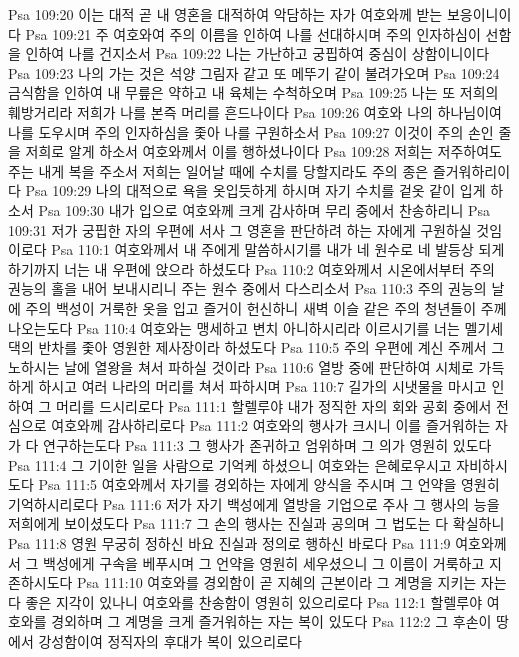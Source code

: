 Psa 109:20  이는 대적 곧 내 영혼을 대적하여 악담하는 자가 여호와께 받는 보응이니이다
Psa 109:21  주 여호와여 주의 이름을 인하여 나를 선대하시며 주의 인자하심이 선함을 인하여 나를 건지소서
Psa 109:22  나는 가난하고 궁핍하여 중심이 상함이니이다
Psa 109:23  나의 가는 것은 석양 그림자 같고 또 메뚜기 같이 불려가오며
Psa 109:24  금식함을 인하여 내 무릎은 약하고 내 육체는 수척하오며
Psa 109:25  나는 또 저희의 훼방거리라 저희가 나를 본즉 머리를 흔드나이다
Psa 109:26  여호와 나의 하나님이여 나를 도우시며 주의 인자하심을 좇아 나를 구원하소서
Psa 109:27  이것이 주의 손인 줄을 저희로 알게 하소서 여호와께서 이를 행하셨나이다
Psa 109:28  저희는 저주하여도 주는 내게 복을 주소서 저희는 일어날 때에 수치를 당할지라도 주의 종은 즐거워하리이다
Psa 109:29  나의 대적으로 욕을 옷입듯하게 하시며 자기 수치를 겉옷 같이 입게 하소서
Psa 109:30  내가 입으로 여호와께 크게 감사하며 무리 중에서 찬송하리니
Psa 109:31  저가 궁핍한 자의 우편에 서사 그 영혼을 판단하려 하는 자에게 구원하실 것임이로다
Psa 110:1  여호와께서 내 주에게 말씀하시기를 내가 네 원수로 네 발등상 되게 하기까지 너는 내 우편에 앉으라 하셨도다
Psa 110:2  여호와께서 시온에서부터 주의 권능의 홀을 내어 보내시리니 주는 원수 중에서 다스리소서
Psa 110:3  주의 권능의 날에 주의 백성이 거룩한 옷을 입고 즐거이 헌신하니 새벽 이슬 같은 주의 청년들이 주께 나오는도다
Psa 110:4  여호와는 맹세하고 변치 아니하시리라 이르시기를 너는 멜기세댁의 반차를 좇아 영원한 제사장이라 하셨도다
Psa 110:5  주의 우편에 계신 주께서 그 노하시는 날에 열왕을 쳐서 파하실 것이라
Psa 110:6  열방 중에 판단하여 시체로 가득하게 하시고 여러 나라의 머리를 쳐서 파하시며
Psa 110:7  길가의 시냇물을 마시고 인하여 그 머리를 드시리로다
Psa 111:1  할렐루야 내가 정직한 자의 회와 공회 중에서 전심으로 여호와께 감사하리로다
Psa 111:2  여호와의 행사가 크시니 이를 즐거워하는 자가 다 연구하는도다
Psa 111:3  그 행사가 존귀하고 엄위하며 그 의가 영원히 있도다
Psa 111:4  그 기이한 일을 사람으로 기억케 하셨으니 여호와는 은혜로우시고 자비하시도다
Psa 111:5  여호와께서 자기를 경외하는 자에게 양식을 주시며 그 언약을 영원히 기억하시리로다
Psa 111:6  저가 자기 백성에게 열방을 기업으로 주사 그 행사의 능을 저희에게 보이셨도다
Psa 111:7  그 손의 행사는 진실과 공의며 그 법도는 다 확실하니
Psa 111:8  영원 무궁히 정하신 바요 진실과 정의로 행하신 바로다
Psa 111:9  여호와께서 그 백성에게 구속을 베푸시며 그 언약을 영원히 세우셨으니 그 이름이 거룩하고 지존하시도다
Psa 111:10  여호와를 경외함이 곧 지혜의 근본이라 그 계명을 지키는 자는 다 좋은 지각이 있나니 여호와를 찬송함이 영원히 있으리로다
Psa 112:1  할렐루야 여호와를 경외하며 그 계명을 크게 즐거워하는 자는 복이 있도다
Psa 112:2  그 후손이 땅에서 강성함이여 정직자의 후대가 복이 있으리로다
